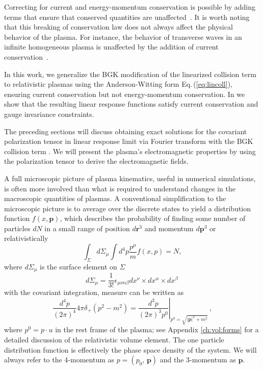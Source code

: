 Correcting for current and energy-momentum conservation is possible by adding terms that ensure that conserved quantities are unaffected~\cite{Bhatnagar:1954zz,Greene1973,Rocha:2021zcw,Singha:2023eia}. It is worth noting that this breaking of conservation law does not always affect the physical behavior of the plasma. For instance, the behavior of transverse waves in an infinite homogeneous plasma is unaffected by the addition of current conservation~\cite{Formanek:2021blc}.

In this work, we generalize the BGK modification of the linearized collision term to relativistic plasmas using the Anderson-Witting form Eq.\,(\ref{eq:lincoll}), ensuring current conservation  but not energy-momentum conservation. In \cite{Formanek:2021blc} we show that the resulting linear response functions satisfy current conservation and gauge invariance constraints. 

The preceding sections will discuss obtaining exact solutions for the covariant polarization tensor in linear response limit via Fourier transform with the BGK collision term . We will present the plasma's electromagnetic properties by using the polarization tensor to derive the electromagnetic fields.

\label{sec:CKT}
A full microscopic picture of plasma kinematics, useful in numerical simulations, is often more involved than what is required to understand changes in the macroscopic quantities of plasmas. A conventional simplification to the microscopic picture is to average over the discrete states to yield a distribution function $f(x,\boldsymbol{p})$, which describes the probability of finding some number of particles $dN$ in a small range of position $d\mathbf{r}^3$ and momentum $d\boldsymbol{p}^3$ or relativistically~\cite{Hakim:2011bk}
\begin{equation}
    \int_{\Sigma}d\Sigma_{\mu}\int  d^4p\frac{p^\mu}{m}f(x,p) = N,
\end{equation}
where $d\Sigma_\mu$ is the surface element on $\Sigma$
\begin{equation}
    d\Sigma_\mu = \frac{1}{3!}\epsilon_{\mu \nu \alpha\beta} dx^\nu \times dx^\alpha\times dx^\beta\,
\end{equation}
with the covariant integration, measure can be written as
\begin{equation}\label{eq:measure} 
 \frac{d^4p}{(2\pi)^4}4\pi \delta_+(p^2-m^2) = \left.\frac{d^3p}{(2\pi)^3p^0}\right|_{p^0 = \sqrt{|\boldsymbol{p}|^2 + m^2}} \,,
\end{equation}
where $p^0 = p \cdot u$ in the rest frame of the plasma; see Appendix \ref{ch:vol:forms} for a detailed discussion of the relativistic volume element. The one particle distribution function is effectively the phase space density of the system. We will always refer to the 4-momentum as $p = (p_0, \, \boldsymbol{p})$ and the 3-momentum as $\boldsymbol{p}$.

